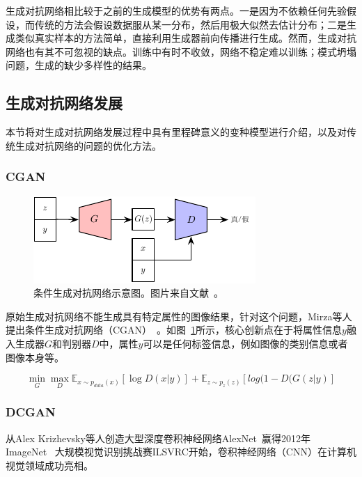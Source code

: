 生成对抗网络相比较于之前的生成模型的优势有两点。一是因为不依赖任何先验假设，而传统的方法会假设数据服从某一分布，然后用极大似然去估计分布；二是生成类似真实样本的方法简单，直接利用生成器前向传播进行生成。然而，生成对抗网络也有其不可忽视的缺点。训练中有时不收敛，网络不稳定难以训练；模式坍塌问题，生成的缺少多样性的结果。

\subsection{生成对抗网络发展}
本节将对生成对抗网络发展过程中具有里程碑意义的变种模型进行介绍，以及对传统生成对抗网络的问题的优化方法。

\subsubsection{CGAN}

\begin{figure}[ht]
    \centering
	\includegraphics[width=\textwidth]{figures/CGAN.pdf}
	\caption{条件生成对抗网络示意图。图片来自文献~\cite{mirza2014conditional}。}
	\label{fig:pic_CGAN}
\end{figure}

原始生成对抗网络不能生成具有特定属性的图像结果，针对这个问题，Mirza等人提出条件生成对抗网络（CGAN）~\citep{mirza2014conditional}。如图~\ref{fig:pic_CGAN}所示，核心创新点在于将属性信息$y$融入生成器$G$和判别器$D$中，属性$y$可以是任何标签信息，例如图像的类别信息或者图像本身等。

\begin{equation}
\label{equ:equ_CGAN}
\mathop{min} \limits_{G} \mathop{max} \limits_{D} \mathbb{E}_{x \sim p_{data}(x)}[\log D(x|y)] + \mathbb{E}_{z \sim p_{z}(z)}[log(1-D(G(z|y)]
\end{equation}



\subsubsection{DCGAN}
从Alex Krizhevsky等人创造大型深度卷积神经网络AlexNet~\cite{krizhevsky2017imagenet}赢得2012年ImageNet~\cite{deng2009imagenet} 大规模视觉识别挑战赛ILSVRC开始，卷积神经网络（CNN）在计算机视觉领域成功亮相。

